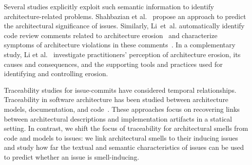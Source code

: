 Several studies explicitly exploit such semantic information to identify architecture-related problems.
Shahbazian et al.~\cite{shahbazian_2018} propose an approach to predict the architectural significance of issues.
Similarly, Li~et~al. automatically identify code review comments related to architecture erosion~\cite{li_2022} and characterize symptoms of architecture violations in these comments~\cite{li_2023}.
In a complementary study, Li et al.~\cite{li_2021} investigate practitioners' perception of architecture erosion, its causes and consequences, and the supporting tools and practices used for identifying and controlling erosion.

Traceability studies for issue-commits have considered temporal relationships\cite{rath_traceability_2018}. 
Traceability in software architecture has been studied between architecture models, documentation, and code~\cite{fuchs_enabling_2025,fuchs_whos_2025,keim_recovering_2024,fuchs_establishing_2023,keim_trace_2021,fuchs_lissa_2025}.
These approaches focus on recovering  links between architectural descriptions and implementation artifacts in a statical setting.
In contrast, we shift the focus of traceability for architectural smells from code and models to issues: we link architectural smells to their inducing issues and study how far the textual and semantic characteristics of issues can be used to predict whether an issue is smell-inducing.

